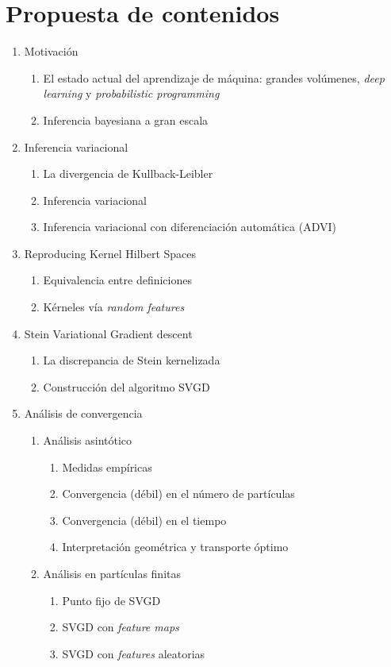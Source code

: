 \documentclass[11pt]{article}
\begin{document}
\section{Propuesta de contenidos}
\begin{enumerate}
	\item Motivación
	\begin{enumerate}[label=1.\arabic*]
		\item El estado actual del aprendizaje de máquina:  grandes volúmenes, \textit{deep learning} y \textit{probabilistic programming} 
		\item Inferencia bayesiana a gran escala
	\end{enumerate}
	\item Inferencia variacional
	\begin{enumerate}[label=2.\arabic*]
		\item La divergencia de Kullback-Leibler
		\item Inferencia variacional
		\item Inferencia variacional con diferenciación automática (ADVI)
	\end{enumerate}
	\item Reproducing Kernel Hilbert Spaces
	\begin{enumerate}[label=3.\arabic*]
		\item Equivalencia entre definiciones %
		\item Kérneles vía \textit{random features}
	\end{enumerate}
	\item Stein Variational Gradient descent
	\begin{enumerate}[label=4.\arabic*]
		\item La discrepancia de Stein kernelizada
		\item Construcción del algoritmo SVGD
	\end{enumerate}
	\item Análisis de convergencia
	\begin{enumerate}[label=5.\arabic*]
		\item Análisis asintótico 
		\begin{enumerate}[label=5.1.\arabic*]
			\item Medidas empíricas
			\item Convergencia (débil) en el número de partículas
			\item Convergencia (débil) en el tiempo
			\item Interpretación geométrica y transporte óptimo 
		\end{enumerate}
		\item Análisis en partículas finitas
		\begin{enumerate}[label=5.2.\arabic*]
			\item Punto fijo de SVGD
			\item SVGD con \textit{feature maps}
			\item SVGD con \textit{features} aleatorias
		\end{enumerate}


\end{enumerate}
\end{enumerate}
\end{document}

